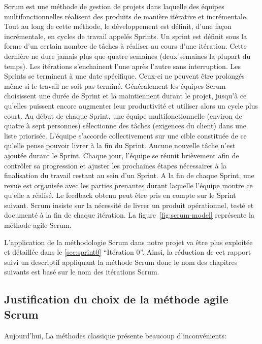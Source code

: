 Scrum est une méthode de gestion de projets dans laquelle des équipes
multifonctionnelles réalisent des produits de manière itérative et
incrémentale. Tout au long de cette méthode, le développement est définit,
d'une façon incrémentale, en cycles de travail appelés Sprints. Un sprint est
définit sous la forme d'un certain nombre de tâches à réaliser au cours d'une
itération. Cette dernière ne dure jamais plus que quatre semaines (deux
semaines la plupart du temps). Les itérations s'enchainent l'une après l'autre
sans interruption. Les Sprints se terminent à une date spécifique. Ceux-ci ne
peuvent être prolongés même si le travail ne soit pas terminé. Généralement les
équipes Scrum choisissent une durée de Sprint et la maintiennent durant le
projet, jusqu'à ce qu'elles puissent encore augmenter leur productivité et
utiliser alors un cycle plus court. Au début de chaque Sprint, une équipe
multifonctionnelle (environ de quatre à sept personnes) sélectionne des tâches
(exigences du client) dans une liste priorisée. L'équipe s'accorde
collectivement sur une cible constituée de ce qu'elle pense pouvoir livrer à la
fin du Sprint. Aucune nouvelle tâche n'est ajoutée durant le Sprint. Chaque
jour, l'équipe se réunit brièvement afin de contrôler sa progression et ajuster
les prochaines étapes nécessaires à la finalisation du travail restant au sein
d'un Sprint. A la fin de chaque Sprint, une revue est organisée avec les
parties prenantes durant laquelle l'équipe montre ce qu'elle a réalisé. Le
feedback obtenu peut être pris en compte sur le Sprint suivant. Scrum insiste
sur la nécessité de livrer un produit opérationnel, testé et documenté à la fin
de chaque itération. La figure~\ref{fig:scrum-model} représente la méthode
agile Scrum.

L'application de la méthodologie Scrum dans notre projet 
va être plus exploitée et détaillée dans le \autoref{sec:sprint0} ``Itération
0''. Ainsi, la réduction de cet rapport suivi un descriptif appliquant la
méthode Scrum donc le nom des chapitres suivants est basé sur le nom des
itérations Scrum.




\subsection{Justification du choix de la méthode agile Scrum}

Aujourd'hui, La méthodes classique présente beaucoup d'inconvénients:

